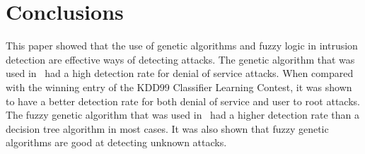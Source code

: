 \documentclass{sig-alternate}
\begin{document}
\section{Conclusions}
\label{sec:conclusion}
This paper showed that the use of genetic algorithms and fuzzy logic in intrusion detection are effective ways of detecting attacks. The genetic algorithm that was used in~\cite{DBLP:journals/corr/abs-1204-1336} had a high detection rate for denial of service attacks. When compared with the winning entry of the KDD99 Classifier Learning Contest, it was shown to have a better detection rate for both denial of service and user to root attacks. The fuzzy genetic algorithm that was used in~\cite{6496342, 6559603} had a higher detection rate than a decision tree algorithm in most cases. It was also shown that fuzzy genetic algorithms are good at detecting unknown attacks. 








  
\end{document}

